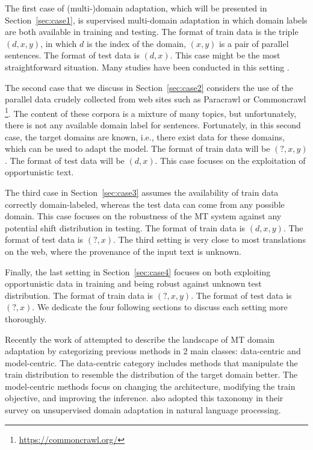 The first case of (multi-)domain adaptation, which will be presented in Section~\ref{sec:case1}, is supervised multi-domain adaptation in which domain labels are both available in training and testing. The format of train data is the triple $(d,x,y)$, in which $d$ is the index of the domain, $(x,y)$ is a pair of parallel sentences. The format of test data is $(d,x)$. This case might be the most straightforward situation. Many studies have been conducted in this setting \citep{Pham21revisiting}.

The second case that we discuss in Section~\ref{sec:case2} considers the use of the parallel data crudely collected from web sites such as Paracrawl \citep{Banon20Paracrawl} or Commoncrawl \footnote{\url{https://commoncrawl.org/}}. The content of these corpora is a mixture of many topics, but unfortunately, there is not any available domain label for sentences. Fortunately, in this second case, the target domains are known, i.e., there exist data for these domains, which can be used to adapt the model. The format of train data will be $(?,x,y)$. The format of test data will be $(d,x)$. This case focuses on the exploitation of opportunistic text. 

The third case in Section~\ref{sec:case3} assumes the availability of train data correctly domain-labeled, whereas the test data can come from any possible domain. This case focuses on the robustness of the MT system against any potential shift distribution in testing. The format of train data is $(d,x,y)$. The format of test data is $(?,x)$. The third setting is very close to most translations on the web, where the provenance of the input text is unknown. 

Finally, the last setting in Section~\ref{sec:case4} focuses on both exploiting opportunistic data in training and being robust against unknown test distribution. The format of train data is $(?,x,y)$. The format of test data is $(?,x)$. We dedicate the four following sections to discuss each setting more thoroughly.

Recently the work of \citet{Chu18survey} attempted to describe the landscape of MT domain adaptation by categorizing previous methods in 2 main classes: data-centric and model-centric. The data-centric category includes methods that manipulate the train distribution to resemble the distribution of the target domain better. The model-centric methods focus on changing the architecture, modifying the train objective, and improving the inference. \citet{ramponi20neural} also adopted this taxonomy in their survey on unsupervised domain adaptation in natural language processing.

